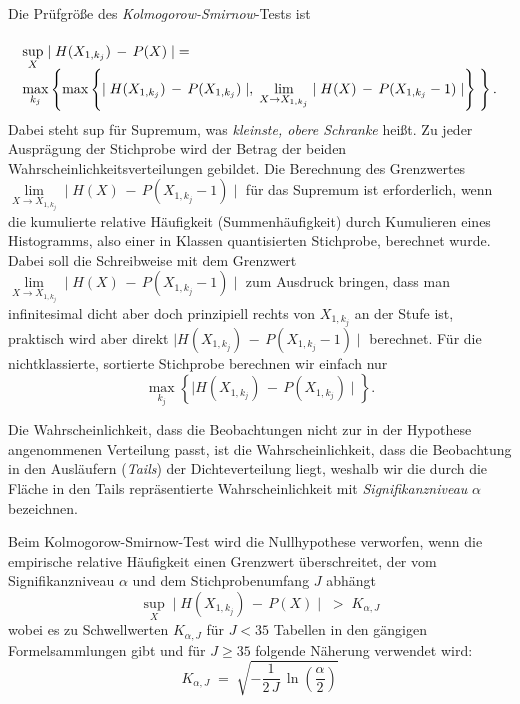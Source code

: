 Die Prüfgröße des \textsl{Kolmogorow-Smirnow}-Tests ist
\begin{equation}
\arraycolsep=2.4pt\def\arraystretch{2}
\begin{array}{l}
\sup\limits_{X} \mid H(X_{1,k_j}) \, - \, P(X) \mid \; = \;\\
\max\limits_{k_j} \left\{ \max \left\{ \mid H(X_{1,k_j}) \, - \, P(X_{1,k_j}) \mid, \;
\lim\limits_{X \rightarrow X_{1,k_j}} \mid H(X) \, - \, P(X_{1,k_j} - 1) \mid \right\} \; \right\} .
\end{array}
\end{equation}
Dabei steht sup für Supremum, was \textsl{kleinste, obere Schranke} heißt.
Zu jeder Ausprägung der Stichprobe wird der Betrag der beiden Wahrscheinlichkeitsverteilungen
gebildet. Die Berechnung des Grenzwertes
$\lim\limits_{X \rightarrow X_{1,k_j}} \mid H(X) \, - \, P(X_{1,k_j} - 1) \mid$
für das Supremum ist erforderlich, wenn die kumulierte relative Häufigkeit
(Summenhäufigkeit) durch Kumulieren eines Histogramms, also einer in Klassen
quantisierten Stichprobe, berechnet wurde. Dabei soll die Schreibweise mit
dem Grenzwert $\lim\limits_{X \rightarrow X_{1,k_j}} \mid H(X) \, - \, P(X_{1,k_j} - 1) \mid$
zum Ausdruck bringen, dass man infinitesimal dicht aber doch prinzipiell rechts 
von $X_{1,k_j}$ an der Stufe ist, praktisch wird aber direkt
$\mid H(X_{1,k_j}) \, - \, P(X_{1,k_j} - 1) \mid$
berechnet. Für die nichtklassierte, sortierte Stichprobe berechnen wir einfach nur
\begin{equation}
\max\limits_{k_j} \left\{ \mid H(X_{1,k_j}) \, - \, P(X_{1,k_j}) \mid \right\} .
\end{equation}

Die Wahrscheinlichkeit, dass die Beobachtungen nicht zur in der Hypothese angenommenen
Verteilung passt, ist die Wahrscheinlichkeit, dass die Beobachtung
in den Ausläufern (\textsl{Tails}) der Dichteverteilung liegt, weshalb wir
die durch die Fläche in den Tails repräsentierte Wahrscheinlichkeit mit
\textsl{Signifikanzniveau} $\alpha$ bezeichnen.

Beim Kolmogorow-Smirnow-Test wird die Nullhypothese verworfen, wenn
die empirische relative Häufigkeit einen Grenzwert überschreitet,
der vom Signifikanzniveau $\alpha$ und dem Stichprobenumfang $J$ abhängt
\begin{equation}
\sup\limits_{X} \mid H(X_{1,k_j}) \, - \, P(X) \mid \; > \; K_{\alpha, J}
\end{equation}
wobei es zu Schwellwerten $K_{\alpha, J}$ für $J < 35$ Tabellen in den gängigen
Formelsammlungen gibt und
für $J \geq 35$ folgende Näherung verwendet wird:
\begin{equation}
K_{\alpha, J} \; = \; \sqrt{-\frac{1}{2 \, J} \, \ln(\frac{\alpha}{2})}
\label{KSpruefgroesse}
\end{equation}


